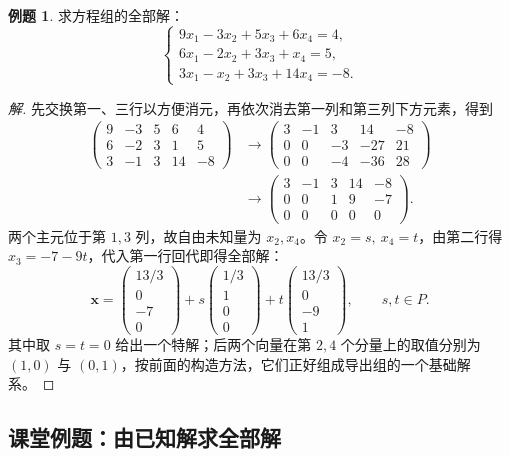 \documentclass[UTF8, fontset=fandol, a4paper, 12pt]{ctexart}
\newcommand{\vx}{\boldsymbol{x}}
\theoremstyle{definition}
\newtheorem{example}[definition]{例题}
\begin{document}
\begin{example}
求方程组的全部解：
\[
 \begin{cases}
 9x_1-3x_2+5x_3+6x_4=4,\\
 6x_1-2x_2+3x_3+x_4=5,\\
 3x_1-x_2+3x_3+14x_4=-8.
 \end{cases}
\]
\end{example}
\begin{proof}[解]
先交换第一、三行以方便消元，再依次消去第一列和第三列下方元素，得到
\begin{align*}
 \left(\begin{array}{rrrr|r}9&-3&5&6&4\\6&-2&3&1&5\\3&-1&3&14&-8\end{array}\right)
 &\longrightarrow
 \left(\begin{array}{rrrr|r}3&-1&3&14&-8\\0&0&-3&-27&21\\0&0&-4&-36&28\end{array}\right)\\
 &\longrightarrow
 \left(\begin{array}{rrrr|r}3&-1&3&14&-8\\0&0&1&9&-7\\0&0&0&0&0\end{array}\right).
\end{align*}
两个主元位于第 $1,3$ 列，故自由未知量为 $x_2,x_4$。令 $x_2=s,\ x_4=t$，由第二行得 $x_3=-7-9t$，代入第一行回代即得全部解：
\[
 \boxed{\vx=
 \begin{pmatrix}13/3\\0\\-7\\0\end{pmatrix}
 +s\begin{pmatrix}1/3\\1\\0\\0\end{pmatrix}
 +t\begin{pmatrix}13/3\\0\\-9\\1\end{pmatrix},\qquad s,t\in P.}
\]
其中取 $s=t=0$ 给出一个特解；后两个向量在第 $2,4$ 个分量上的取值分别为 $(1,0)$ 与 $(0,1)$，按前面的构造方法，它们正好组成导出组的一个基础解系。
\end{proof}

\subsection{课堂例题：由已知解求全部解}
\end{document}
